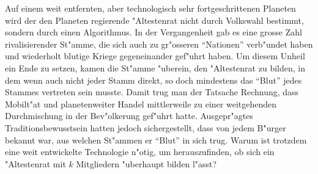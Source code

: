 Auf einem weit entfernten, aber technologisch sehr fortgeschrittenen
Planeten wird der den Planeten regierende "Altestenrat
nicht durch Volkswahl bestimmt, sondern durch einen Algorithmus.
In der Vergangenheit gab es eine grosse Zahl rivalisierender
St"amme, die sich auch zu gr"osseren ``Nationen'' verb"undet haben
und wiederholt blutige Kriege gegeneinander gef"uhrt haben.
Um diesem Unheil ein Ende zu setzen, kamen die St"amme "uberein,
den "Altestenrat zu bilden, in dem wenn auch nicht jeder Stamm direkt,
so doch mindestens das ``Blut'' jedes Stammes vertreten sein musste.
Damit trug man der Tatsache Rechnung, dass Mobilt"at und planetenweiter
Handel mittlerweile zu einer weitgehenden Durchmischung in der
Bev"olkerung gef"uhrt hatte. Ausgepr"agtes Traditionsbewusstsein hatten
jedoch sichergestellt, dass von jedem B"urger bekannt war, aus welchen
St"ammen er ``Blut'' in sich trug. Warum ist trotzdem eine weit entwickelte
Technologie n"otig, um herauszufinden, ob sich ein "Altestenrat
mit $k$ Mitgliedern "uberhaupt bilden l"asst?


